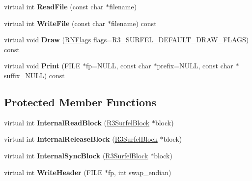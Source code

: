 \begin{DoxyCompactItemize}
\item 
virtual int {\bfseries Read\+File} (const char $\ast$filename)\hypertarget{class_r3_surfel_database_a24337bc7e9f6a21de2dc1f8eb18b0be4}{}\label{class_r3_surfel_database_a24337bc7e9f6a21de2dc1f8eb18b0be4}

\item 
virtual int {\bfseries Write\+File} (const char $\ast$filename) const \hypertarget{class_r3_surfel_database_aa65bd789df04eb8404e0d705088b3fcc}{}\label{class_r3_surfel_database_aa65bd789df04eb8404e0d705088b3fcc}

\item 
virtual void {\bfseries Draw} (\hyperlink{class_r_n_flags}{R\+N\+Flags} flags=R3\+\_\+\+S\+U\+R\+F\+E\+L\+\_\+\+D\+E\+F\+A\+U\+L\+T\+\_\+\+D\+R\+A\+W\+\_\+\+F\+L\+A\+GS) const \hypertarget{class_r3_surfel_database_a697607241ec3415fc85c7a5f2054c3f8}{}\label{class_r3_surfel_database_a697607241ec3415fc85c7a5f2054c3f8}

\item 
virtual void {\bfseries Print} (F\+I\+LE $\ast$fp=N\+U\+LL, const char $\ast$prefix=N\+U\+LL, const char $\ast$suffix=N\+U\+LL) const \hypertarget{class_r3_surfel_database_a94a9c9e4f331feba5a58830c95efc4f2}{}\label{class_r3_surfel_database_a94a9c9e4f331feba5a58830c95efc4f2}

\end{DoxyCompactItemize}
\subsection*{Protected Member Functions}
\begin{DoxyCompactItemize}
\item 
virtual int {\bfseries Internal\+Read\+Block} (\hyperlink{class_r3_surfel_block}{R3\+Surfel\+Block} $\ast$block)\hypertarget{class_r3_surfel_database_af4d87914f40606bd19d52c0af1d2cbaa}{}\label{class_r3_surfel_database_af4d87914f40606bd19d52c0af1d2cbaa}

\item 
virtual int {\bfseries Internal\+Release\+Block} (\hyperlink{class_r3_surfel_block}{R3\+Surfel\+Block} $\ast$block)\hypertarget{class_r3_surfel_database_a039fd684c35cc111512b527dc4742cb7}{}\label{class_r3_surfel_database_a039fd684c35cc111512b527dc4742cb7}

\item 
virtual int {\bfseries Internal\+Sync\+Block} (\hyperlink{class_r3_surfel_block}{R3\+Surfel\+Block} $\ast$block)\hypertarget{class_r3_surfel_database_a702ce175a88d88989d8f33e0418c51e6}{}\label{class_r3_surfel_database_a702ce175a88d88989d8f33e0418c51e6}

\item 
virtual int {\bfseries Write\+Header} (F\+I\+LE $\ast$fp, int swap\+\_\+endian)\hypertarget{class_r3_surfel_database_ab517443be336039648bc9caf2732be97}{}\label{class_r3_surfel_database_ab517443be336039648bc9caf2732be97}

\end{DoxyCompactItemize}
